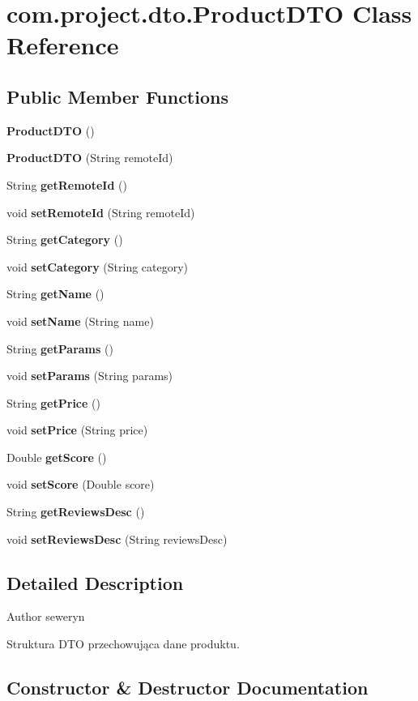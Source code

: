 \section{com.\+project.\+dto.\+Product\+D\+TO Class Reference}
\label{classcom_1_1project_1_1dto_1_1_product_d_t_o}
\subsection*{Public Member Functions}
\begin{DoxyCompactItemize}
\item 
\textbf{ Product\+D\+TO} ()
\item 
\textbf{ Product\+D\+TO} (String remote\+Id)
\item 
String \textbf{ get\+Remote\+Id} ()
\item 
void \textbf{ set\+Remote\+Id} (String remote\+Id)
\item 
String \textbf{ get\+Category} ()
\item 
void \textbf{ set\+Category} (String category)
\item 
String \textbf{ get\+Name} ()
\item 
void \textbf{ set\+Name} (String name)
\item 
String \textbf{ get\+Params} ()
\item 
void \textbf{ set\+Params} (String params)
\item 
String \textbf{ get\+Price} ()
\item 
void \textbf{ set\+Price} (String price)
\item 
Double \textbf{ get\+Score} ()
\item 
void \textbf{ set\+Score} (Double score)
\item 
String \textbf{ get\+Reviews\+Desc} ()
\item 
void \textbf{ set\+Reviews\+Desc} (String reviews\+Desc)
\end{DoxyCompactItemize}


\subsection{Detailed Description}
\begin{DoxyAuthor}{Author}
seweryn
\end{DoxyAuthor}
Struktura D\+TO przechowująca dane produktu. 

\subsection{Constructor \& Destructor Documentation}
\mbox{\label{classcom_1_1project_1_1dto_1_1_product_d_t_o_a8d5348e0560b604f30128393b56f2c80}} 
